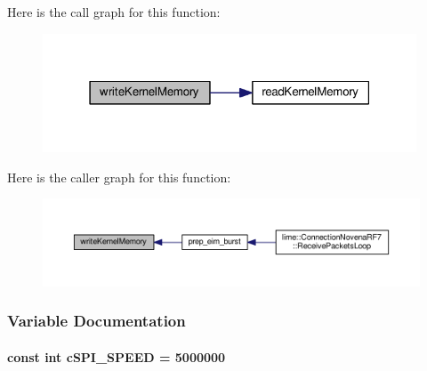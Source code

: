 Here is the call graph for this function\+:
\nopagebreak
\begin{figure}[H]
\begin{center}
\leavevmode
\includegraphics[width=315pt]{dd/df4/ConnectionNovenaRF7__streaming_8cpp_ab4e68de971a960f7dad07ce349480ecf_cgraph}
\end{center}
\end{figure}




Here is the caller graph for this function\+:
\nopagebreak
\begin{figure}[H]
\begin{center}
\leavevmode
\includegraphics[width=350pt]{dd/df4/ConnectionNovenaRF7__streaming_8cpp_ab4e68de971a960f7dad07ce349480ecf_icgraph}
\end{center}
\end{figure}




\subsubsection{Variable Documentation}
\paragraph[{c\+S\+P\+I\+\_\+\+S\+P\+E\+ED}]{\setlength{\rightskip}{0pt plus 5cm}const {\bf int} c\+S\+P\+I\+\_\+\+S\+P\+E\+ED = 5000000\hspace{0.3cm}{\ttfamily [static]}}\label{ConnectionNovenaRF7__streaming_8cpp_affb644df422da85c3552247e450faa6b}


